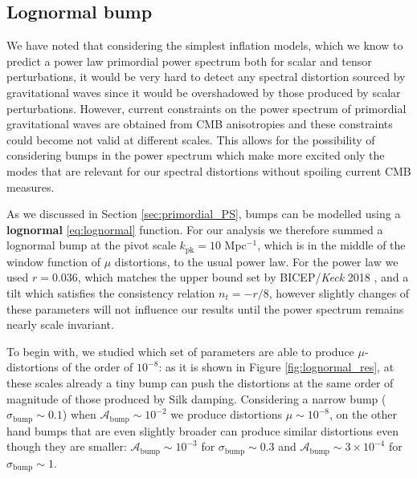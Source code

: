 \subsection{Lognormal bump}
We have noted that considering the simplest inflation models, which we know to predict a power law primordial power spectrum both for scalar and tensor perturbations, it would  be very hard to detect any spectral distortion sourced by gravitational waves since it would be overshadowed by those produced by scalar perturbations. However, current constraints on the power spectrum of primordial gravitational waves are obtained from CMB anisotropies and these constraints could become not valid at different scales. This allows for the possibility of considering bumps in the power spectrum which make more excited only the modes that are relevant for our spectral distortions without spoiling current CMB measures.

As we discussed in Section \ref{sec:primordial_PS}, bumps can be modelled using a \textbf{lognormal} \eqref{eq:lognormal} function. For our analysis we therefore summed a lognormal bump at the pivot scale $k_\text{pk}=10$ Mpc$^{-1}$, which is in the middle of the window function of $\mu$ distortions, to the usual power law. For the power law we used $r=0.036$, which matches the upper bound set by BICEP/\textit{Keck} 2018 \cite{Ade_2021}, and a tilt which satisfies the consistency relation $n_t=-r/8$, however slightly changes of these parameters will not influence our results until the power spectrum remains nearly scale invariant. 

To begin with, we studied which set of parameters are able to produce $\mu$-distortions of the order of $10^{-8}$: as it is shown in Figure \ref{fig:lognormal_res}, at these scales already a tiny bump can push the distortions at the same order of magnitude of those produced by Silk damping. Considering a narrow bump ($\sigma_\text{bump}\sim0.1$) when $\mathcal{A}_\text{bump}\sim 10^{-2}$ we produce distortions $\mu\sim10^{-8}$, on the other hand bumps that are even slightly broader can produce similar distortions even though they are smaller: $\mathcal{A}_\text{bump}\sim 10^{-3}$ for $\sigma_\text{bump}\sim0.3$ and $\mathcal{A}_\text{bump}\sim 3\times10^{-4}$ for $\sigma_\text{bump}\sim1$. 

